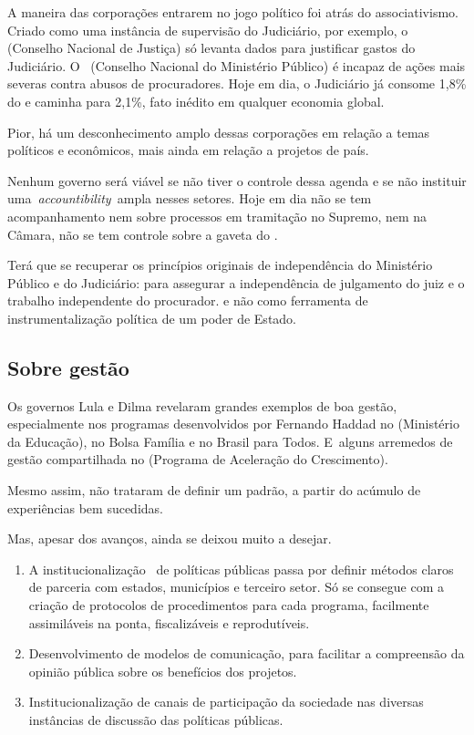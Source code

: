A maneira das corporações entrarem no jogo político foi atrás do
associativismo. Criado como uma instância de supervisão do Judiciário,
por exemplo, o  (Conselho Nacional de Justiça) só levanta dados para
justificar gastos do Judiciário. O~ (Conselho Nacional do Ministério
Público) é incapaz de ações mais severas contra abusos de procuradores.
Hoje em dia, o Judiciário já consome 1,8\% do  e caminha para 2,1\%,
fato inédito em qualquer economia global.

Pior, há um desconhecimento amplo dessas corporações em relação a temas
políticos e econômicos, mais ainda em relação a projetos de país.

Nenhum governo será viável se não tiver o controle dessa agenda e se não
instituir uma~\emph{accountibility~}ampla nesses setores. Hoje em dia
não se tem acompanhamento nem sobre processos em tramitação no Supremo,
nem na Câmara, não se tem controle sobre a gaveta do .

Terá que se recuperar os princípios originais de independência do
Ministério Público e do Judiciário: para assegurar a independência de
julgamento do juiz e o trabalho independente do procurador. e não como
ferramenta de instrumentalização política de um poder de Estado.

\subsection{\textbf{Sobre gestão}}

Os governos Lula e Dilma revelaram grandes exemplos de boa gestão,
especialmente nos programas desenvolvidos por Fernando Haddad no 
(Ministério da Educação), no Bolsa Família e no Brasil para Todos. E~alguns arremedos de gestão compartilhada no  (Programa de Aceleração
do Crescimento).

Mesmo assim, não trataram de definir um padrão, a partir do acúmulo de
experiências bem sucedidas.

Mas, apesar dos avanços, ainda se deixou muito a desejar.~

\begin{enumerate}
\itemsep1pt\parskip0pt
\item
  A institucionalização~ de políticas públicas passa por definir métodos
  claros de parceria com estados, municípios e terceiro setor. Só se
  consegue com a criação de protocolos de procedimentos para cada
  programa, facilmente assimiláveis na ponta, fiscalizáveis e
  reprodutíveis.~
\item
  Desenvolvimento de modelos de comunicação, para facilitar a
  compreensão da opinião pública sobre os benefícios dos projetos.~
\item
  Institucionalização de canais de participação da sociedade nas
  diversas instâncias de discussão das políticas públicas.
\end{enumerate}

